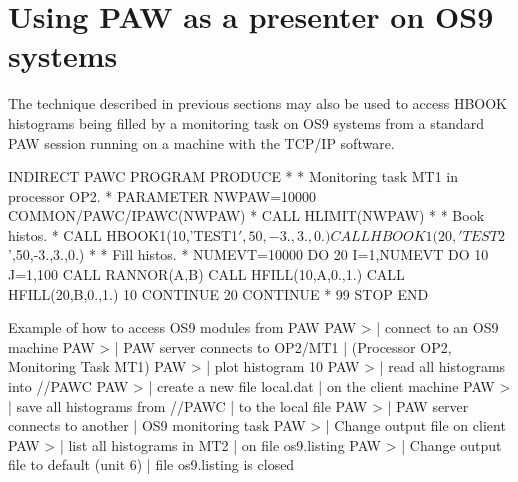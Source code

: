 \section{Using PAW as a presenter on OS9 systems}
 
The technique described in previous sections may also be used
to access HBOOK histograms being filled by a monitoring task
on OS9 systems from a standard PAW session running
on a machine with the TCP/IP software.
 
\begin{minipage}{.48\textwidth}
\begin{XMP}
      INDIRECT PAWC
      PROGRAM PRODUCE
*
*        Monitoring task MT1 in processor OP2.
*
      PARAMETER NWPAW=10000
      COMMON/PAWC/IPAWC(NWPAW)
*
      CALL HLIMIT(NWPAW)
*
*       Book histos.
*
      CALL HBOOK1(10,'TEST1$',50,-3.,3.,0.)
      CALL HBOOK1(20,'TEST2$',50,-3.,3.,0.)
*
*       Fill histos.
*
      NUMEVT=10000
      DO 20 I=1,NUMEVT
         DO 10 J=1,100
            CALL RANNOR(A,B)
            CALL HFILL(10,A,0.,1.)
            CALL HFILL(20,B,0.,1.)
 10      CONTINUE
 20   CONTINUE
*
 99   STOP
      END
\end{XMP}
\end{minipage}\hfill
\begin{minipage}{.50\textwidth}
\begin{Fighere}
\caption{Visualising histograms on OS9 modules from PAW}
\end{Fighere}
\end{minipage}
\bigskip
 
\begin{XMPt}{Example of how to access OS9 modules from PAW}
PAW >                             | connect to an OS9 machine
PAW >                       | PAW server connects to OP2/MT1
                                                 | (Processor OP2, Monitoring Task MT1)
PAW >                               | plot histogram 10
PAW >                                      | read all histograms into //PAWC
PAW >               | create a new file local.dat
                                                 | on the client machine
PAW >                                     | save all histograms from //PAWC
                                                 | to the local file
PAW >                       | PAW server connects to another
                                                 | OS9 monitoring task
PAW >                       | Change output file on client
PAW >                                 | list all histograms in MT2
                                                 | on file os9.listing
PAW >                                 | Change output file to default (unit 6)
                                                 | file os9.listing is closed
\end{XMPt}\endinput
